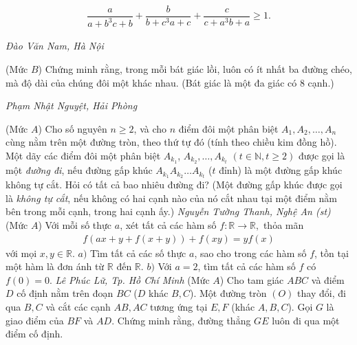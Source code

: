\begin{multicols}{2}
\begin{align*}
		\dfrac{a}{a\!+\!b^{3} c\!+\!b}+\dfrac{b}{b\!+\!c^{3} a\!+\!c}+\dfrac{c}{c\!+\!a^{3} b\!+a} \ge 1.
	\end{align*}
	\begin{flushright}
		\textit{Đào Văn Nam, Hà Nội}
	\end{flushright}
	{}
	(Mức $B$) Chứng minh rằng, trong mỗi bát giác lồi, luôn có ít nhất ba đường chéo, mà độ dài của chúng đôi một khác nhau. 
	\vskip 0.05cm
	(Bát giác là một đa giác có $8$ cạnh.)
	\begin{flushright}
		\textit{Phạm Nhật Nguyệt, Hải Phòng}
	\end{flushright}
	{}
	(Mức $A$) Cho số nguyên $n \geq 2$, và cho $n$ điểm đôi một phân biệt $A_1, A_2, \ldots, A_n$ cùng nằm trên một đường tròn, theo thứ tự đó (tính theo chiều kim đồng hồ). Một dãy các điểm đôi một phân biệt $A_{k_1}$, $A_{k_2}, \ldots, A_{k_t}$ $(t \in\mathbb N, t \geq 2)$ được gọi là một {\it đường đi}, nếu đường gấp khúc $A_{k_1} A_{k_2} \ldots A_{k_t}$ ($t$ đỉnh) là một đường gấp khúc không tự cắt. Hỏi có tất cả bao nhiêu đường đi?
	\vskip 0.05cm
	(Một đường gấp khúc được gọi là {\it không tự cắt}, nếu không có hai cạnh nào của nó cắt nhau tại một điểm nằm bên trong mỗi cạnh, trong hai cạnh ấy.)
	\vskip 0.1cm
	\hfill	\textit{Nguyễn Tường Thanh, Nghệ An (st)}
	\vskip 0.1cm
	{}
	(Mức $A$) Với mỗi số thực $a$, xét tất cả các hàm số $f: \mathbb R \rightarrow \mathbb R,$ thỏa mãn
	\begin{align*}
		f(a x+y+f(x+y))+f(x y)=y f(x)
	\end{align*}
	với mọi $x,y\in\mathbb R$.
	$a)$ Tìm tất cả các số thực $a$, sao cho trong các hàm số $f$, tồn tại một hàm là đơn ánh từ $\mathbb R$ đến $\mathbb R$.
	\vskip 0.05cm
	$b)$ Với $a=2$, tìm tất cả các hàm số $f$ có $f(0)=0$.
	\vskip 0.1cm
	\hfill		\textit{Lê Phúc Lữ, Tp. Hồ Chí Minh}
	\vskip 0.1cm
	{}
	(Mức $A$) Cho tam giác $ABC$ và điểm $D$ cố định nằm trên đoạn $BC$ ($D$ khác $B,C$). Một đường tròn $(O)$ thay đổi, đi qua $B, C$ và cắt các cạnh $AB, AC$ tương ứng tại $E, F$ (khác $A,B,C$). Gọi $G$ là giao điểm của $BF$ và $AD$. Chứng minh rằng, đường thẳng $GE$ luôn đi qua một điểm cố định.
	\begin{center}
		\begin{tikzpicture}[line cap=round,line join=round,>=triangle 45,x=1cm,y=1cm,scale=0.55]

\end{tikzpicture}
\end{center}
\end{multicols}
